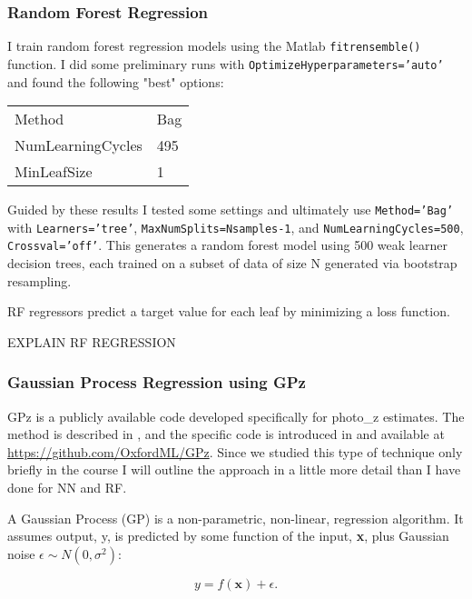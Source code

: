 \documentclass[13pt]{amsart}
\newcommand{\bx}{\textbf{x}}
\newcommand{\equ}[1]{\[#1\]}
\newcommand{\equin}[1]{\(#1\)}
\begin{document}
    \subsubsection{Random Forest Regression}

      I train random forest regression models using the Matlab \texttt{fitrensemble()} function. I did some preliminary runs with \texttt{OptimizeHyperparameters='auto'} and found the following "best" options:

        \begin{table}[H]
        \begin{tabular}{ll}
          Method            & Bag \\
          NumLearningCycles & 495 \\
          MinLeafSize       & 1
        \end{tabular}
        \end{table}

        Guided by these results I tested some settings and ultimately use \texttt{Method='Bag'} with \texttt{Learners='tree'}, \texttt{MaxNumSplits=Nsamples-1}, and \texttt{NumLearningCycles=500}, \texttt{Crossval='off'}. This generates a random forest model using 500 weak learner decision trees, each trained on a subset of data of size N generated via bootstrap resampling.

        RF regressors predict a target value for each leaf by minimizing a loss function.

        EXPLAIN RF REGRESSION



    \subsubsection{Gaussian Process Regression using GPz}
      \label{gpz}

      GPz is a publicly available code developed specifically for photo\_z estimates. The method is described in \cite{sgp}, and the specific code is introduced in \cite{gpz} and available at \url{https://github.com/OxfordML/GPz}. Since we studied this type of technique only briefly in the course I will outline the approach in a little more detail than I have done for NN and RF.

      A Gaussian Process (GP) is a non-parametric, non-linear, regression algorithm. It assumes output, y, is predicted by some function of the input, \bx, plus Gaussian noise \equin{\epsilon \sim N(0,\sigma^2)}:

      \equ{y = f(\bx)+ \epsilon.}
\end{document}
